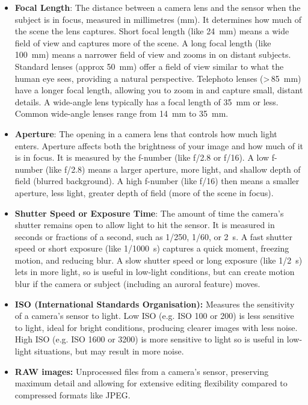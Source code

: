 \documentclass{article}
\begin{document}
\begin{itemize}
    \item {\bf Focal Length}: The distance between a camera lens and the sensor when the subject is in focus, measured in millimetres (mm). It determines how much of the scene the lens captures. Short focal length (like 24~mm) means a wide field of view and captures more of the scene. A long focal length (like 100~mm) means a narrower field of view and zooms in on distant subjects. Standard lenses (approx 50~mm) offer a field of view similar to what the human eye sees, providing a natural perspective. Telephoto lenses (>\,85~mm) have a longer focal length, allowing you to zoom in and capture small, distant details. A wide-angle lens typically has a focal length of 35~mm or less. Common wide-angle lenses range from 14~mm to 35~mm.
    
    \item {\bf Aperture}: The opening in a camera lens that controls how much light enters. Aperture affects both the brightness of your image and how much of it is in focus. It is measured by the f-number (like f/2.8 or f/16). A low f-number (like f/2.8) means a larger aperture, more light, and shallow depth of field (blurred background). A high f-number (like f/16) then means a smaller aperture, less light, greater depth of field (more of the scene in focus).

    \item {\bf Shutter Speed or Exposure Time}: The amount of time the camera's shutter remains open to allow light to hit the sensor. It is measured in seconds or fractions of a second, such as 1/250, 1/60, or 2~s. A fast shutter speed or short exposure (like 1/1000~s) captures a quick moment, freezing motion, and reducing blur. A slow shutter speed or long exposure (like 1/2~s) lets in more light, so is useful in low-light conditions, but can create motion blur if the camera or subject (including an auroral feature) moves.

    \item {\bf ISO (International Standards Organisation):} Measures the sensitivity of a camera's sensor to light. Low ISO (e.g. ISO 100 or 200) is less sensitive to light, ideal for bright conditions, producing clearer images with less noise. High ISO (e.g. ISO 1600 or 3200) is more sensitive to light so is useful in low-light situations, but may result in more noise.

    \item {\bf RAW images:} Unprocessed files from a camera's sensor, preserving maximum detail and allowing for extensive editing flexibility compared to compressed formats like JPEG. 
\end{itemize}
\end{document}
